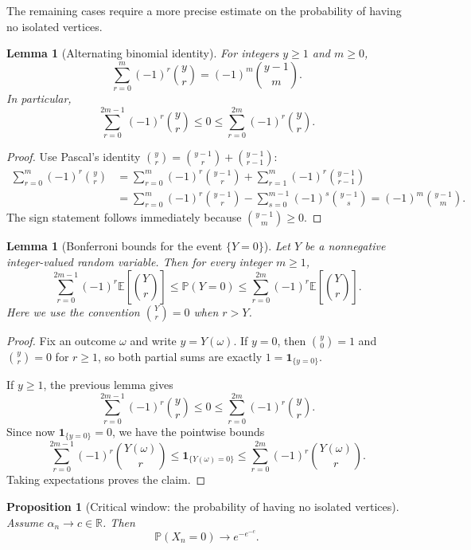 \documentclass[11pt]{article}
\newcommand{\PP}{\mathbb{P}}
\newcommand{\EE}{\mathbb{E}}
\newcommand{\one}{\mathbf{1}}
\newcommand{\bbinom}[2]{\binom{#1}{#2}}
\theoremstyle{plain}
\newtheorem{lemma}[theorem]{Lemma}
\newtheorem{proposition}[theorem]{Proposition}
\theoremstyle{definition}
\begin{document}
The remaining cases require a more precise estimate on the probability of having no isolated vertices.

\begin{lemma}[Alternating binomial identity]
For integers $y\ge 1$ and $m\ge 0$,
\[
\sum_{r=0}^{m} (-1)^r \bbinom{y}{r} = (-1)^m \bbinom{y-1}{m}.
\]
In particular,
\[
\sum_{r=0}^{2m-1} (-1)^r \bbinom{y}{r} \le 0 \le \sum_{r=0}^{2m} (-1)^r \bbinom{y}{r}.
\]
\end{lemma}

\begin{proof}
Use Pascal's identity $\binom{y}{r}=\binom{y-1}{r}+\binom{y-1}{r-1}$:
\begin{align*}
\sum_{r=0}^{m} (-1)^r \bbinom{y}{r}
&=
\sum_{r=0}^{m} (-1)^r \bbinom{y-1}{r}
+
\sum_{r=1}^{m} (-1)^r \bbinom{y-1}{r-1} \\
&=
\sum_{r=0}^{m} (-1)^r \bbinom{y-1}{r}
-
\sum_{s=0}^{m-1} (-1)^s \bbinom{y-1}{s}
= (-1)^m \bbinom{y-1}{m}.
\end{align*}
The sign statement follows immediately because $\binom{y-1}{m}\ge 0$.
\end{proof}

\begin{lemma}[Bonferroni bounds for the event $\{Y=0\}$]
Let $Y$ be a nonnegative integer-valued random variable.  Then for every integer $m\ge 1$,
\[
\sum_{r=0}^{2m-1} (-1)^r \EE\!\left[\bbinom{Y}{r}\right]
\le
\PP(Y=0)
\le
\sum_{r=0}^{2m} (-1)^r \EE\!\left[\bbinom{Y}{r}\right].
\]
Here we use the convention $\binom{Y}{r}=0$ when $r>Y$.
\end{lemma}

\begin{proof}
Fix an outcome $\omega$ and write $y=Y(\omega)$.  If $y=0$, then $\binom{y}{0}=1$ and $\binom{y}{r}=0$ for $r\ge 1$, so both partial sums are exactly $1=\one_{\{y=0\}}$.

If $y\ge 1$, the previous lemma gives
\[
\sum_{r=0}^{2m-1} (-1)^r \bbinom{y}{r} \le 0 \le \sum_{r=0}^{2m} (-1)^r \bbinom{y}{r}.
\]
Since now $\one_{\{y=0\}}=0$, we have the pointwise bounds
\[
\sum_{r=0}^{2m-1} (-1)^r \bbinom{Y(\omega)}{r}
\le
\one_{\{Y(\omega)=0\}}
\le
\sum_{r=0}^{2m} (-1)^r \bbinom{Y(\omega)}{r}.
\]
Taking expectations proves the claim.
\end{proof}

\begin{proposition}[Critical window: the probability of having no isolated vertices]\label{prop:noiso}
Assume $\alpha_n\to c\in\mathbb{R}$.  Then
\[
\PP(X_n=0)\to e^{-e^{-c}}.
\]
\end{proposition}
\end{document}
